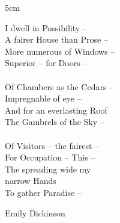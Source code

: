
\begin{dedication} %

\epigraph{5cm}{I dwell in Possibility -- \\
A fairer House than Prose --\\
More numerous of Windows --\\
Superior -- for Doors --\\
\phantom{-}\\
Of Chambers as the Cedars --\\
Impregnable of eye --\\
And for an everlasting Roof \\
The Gambrels of the Sky --\\
\phantom{-}\\
Of Visitors -- the fairest -- \\
For Occupation -- This -- \\
The spreading wide my \\
\phantom{aaaaaaaaaa} narrow Hands \\
To gather Paradise -- 
}{Emily Dickinson}
\end{dedication}


